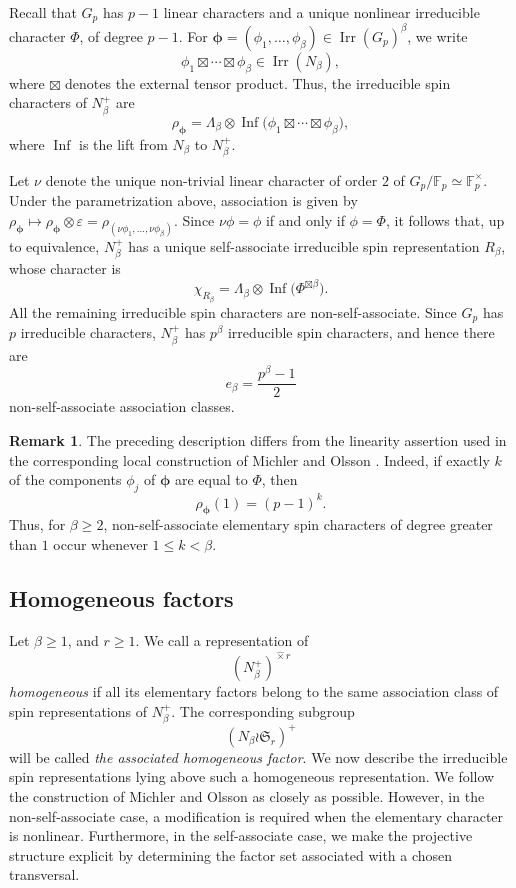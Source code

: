 \documentclass[reqno]{amsart}
\DeclareMathOperator{\Irr}{Irr}
\DeclareMathOperator{\Inf}{Inf}
\newcommand{\sym}{\mathfrak{S}}
\theoremstyle{definition}
\newtheorem{remark}[theorem]{Remark}
\begin{document}
Recall that $G_p$ has $p-1$ linear characters and a unique nonlinear
irreducible character $\Phi$, of degree $p-1$. For
$\boldsymbol\phi=(\phi_1,\ldots,\phi_\beta)\in \Irr(G_p)^\beta$, we write
$$\phi_1\boxtimes\cdots\boxtimes\phi_\beta \in \Irr(N_\beta),$$
where $\boxtimes$ denotes the external tensor product. Thus, the
irreducible spin characters of $N_\beta^+$ are
\[
\rho_{\boldsymbol\phi}
=
\Lambda_\beta\otimes
\Inf\bigl(\phi_1\boxtimes\cdots\boxtimes\phi_\beta\bigr),
\]
where $\Inf$ is the lift from $N_\beta$ to $N_{\beta}^+$.

Let $\nu$ denote the unique non-trivial linear character of order $2$ of
$G_p/\mathbb F_p\simeq \mathbb F_p^\times$. Under the parametrization
above, association is given by
$
\rho_{\boldsymbol\phi}
\longmapsto
\rho_{\boldsymbol\phi}\otimes\varepsilon
=
\rho_{(\nu\phi_1,\ldots,\nu\phi_\beta)}$.
Since $ \nu\phi=\phi $ if and only if $\phi=\Phi$,
it follows that, up to equivalence, $N_\beta^+$ has a unique
self-associate irreducible spin representation $R_\beta$, whose character
is 
\[
\chi_{R_\beta}
=
\Lambda_\beta\otimes\Inf\bigl(\Phi^{\boxtimes \beta}\bigr).
\]
All the remaining irreducible spin characters are non-self-associate.
Since $G_p$ has $p$ irreducible characters, $N_\beta^+$ has $p^\beta$
irreducible spin characters, and hence there are
\[
e_\beta=\frac{p^\beta-1}{2}
\]
non-self-associate association classes.

\begin{remark}
The preceding description differs from the linearity assertion used in
the corresponding local construction of Michler and Olsson
\cite{MichlerOlsson}. Indeed, if exactly $k$ of the components
$\phi_j$ of $\boldsymbol\phi$ are equal to $\Phi$, then
\[
\rho_{\boldsymbol\phi}(1)=(p-1)^k.
\]
Thus, for $\beta\geq2$, non-self-associate elementary spin characters of
degree greater than $1$ occur whenever $1\leq k<\beta$. 
\end{remark}




\subsection{Homogeneous factors}

Let $\beta\geq 1$, and $r\geq 1$. We call a representation of
\[
(N_\beta^+)^{\widehat\times r}
\]
\emph{homogeneous} if all its elementary factors belong to the same
association class of spin representations of $N_\beta^+$. The
corresponding subgroup
\[
(N_\beta\wr \sym_r)^+
\]
will be called \emph{the associated homogeneous factor}.
We now describe the irreducible spin representations lying above such a
homogeneous representation. We follow the construction of Michler and
Olsson as closely as possible. However, in the non-self-associate case, a
modification is required when the elementary character is nonlinear.
Furthermore, in the self-associate case, we make the projective structure
explicit by determining the factor set associated with a chosen
transversal.
\end{document}
